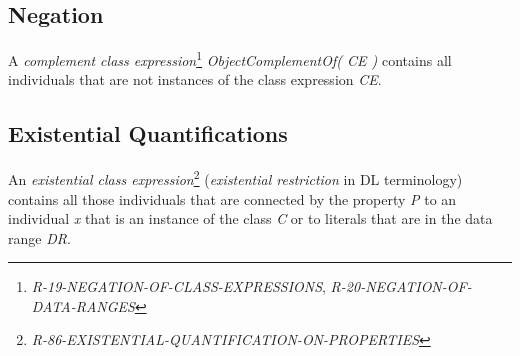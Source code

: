 \documentclass{llncs}
\begin{document}
\subsection{Negation}

A \emph{complement class expression}\footnote{\emph{R-19-NEGATION-OF-CLASS-EXPRESSIONS}, \emph{R-20-NEGATION-OF-DATA-RANGES}} \emph{ObjectComplementOf( CE )} contains all individuals that are not instances of the class expression \emph{CE}. 

\subsection{Existential Quantifications}

An \emph{existential class expression}\footnote{{\em R-86-EXISTENTIAL-QUANTIFICATION-ON-PROPERTIES}} ({\em existential restriction} in DL terminology) contains all those individuals that are connected by the property \emph{P} to an individual \emph{x} that is an instance of the class \emph{C} or to literals that are in the data range \emph{DR}.
\end{document}
